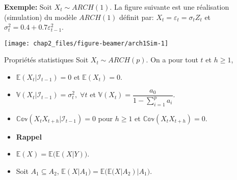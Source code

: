 \documentclass[
  ignorenonframetext,
]{beamer}
\newenvironment{Shaded}{\begin{snugshade}}{\end{snugshade}}
\newcommand{\AttributeTok}[1]{\textcolor[rgb]{0.77,0.63,0.00}{#1}}
\newcommand{\DecValTok}[1]{\textcolor[rgb]{0.00,0.00,0.81}{#1}}
\newcommand{\FloatTok}[1]{\textcolor[rgb]{0.00,0.00,0.81}{#1}}
\newcommand{\FunctionTok}[1]{\textcolor[rgb]{0.00,0.00,0.00}{#1}}
\newcommand{\NormalTok}[1]{#1}
\newcommand{\OtherTok}[1]{\textcolor[rgb]{0.56,0.35,0.01}{#1}}
\newcommand{\SpecialCharTok}[1]{\textcolor[rgb]{0.00,0.00,0.00}{#1}}
\newcommand{\StringTok}[1]{\textcolor[rgb]{0.31,0.60,0.02}{#1}}
\newenvironment{Shaded}{\begin{snugshade}}{\end{snugshade}}
\newcommand{\AttributeTok}[1]{\textcolor[rgb]{0.77,0.63,0.00}{#1}}
\newcommand{\DecValTok}[1]{\textcolor[rgb]{0.00,0.00,0.81}{#1}}
\newcommand{\FloatTok}[1]{\textcolor[rgb]{0.00,0.00,0.81}{#1}}
\newcommand{\FunctionTok}[1]{\textcolor[rgb]{0.00,0.00,0.00}{#1}}
\newcommand{\NormalTok}[1]{#1}
\newcommand{\OtherTok}[1]{\textcolor[rgb]{0.56,0.35,0.01}{#1}}
\newcommand{\SpecialCharTok}[1]{\textcolor[rgb]{0.00,0.00,0.00}{#1}}
\newcommand{\StringTok}[1]{\textcolor[rgb]{0.31,0.60,0.02}{#1}}
\begin{document}
\begin{frame}[fragile]
\textbf{Exemple:} Soit \(X_t \sim ARCH(1)\). La figure suivante est une
réalisation (simulation) du modèle \(ARCH(1)\) définit par:
\(X_t=\varepsilon_t=\sigma_t Z_t\) et
\(\sigma^2_t=0.4+0.7\varepsilon^2_{t-1}\).

\begin{Shaded}
\end{Shaded}
\begin{center}\texttt{[image: chap2\_files/figure-beamer/arch1Sim-1]} \end{center}
\end{frame}
\begin{frame}{Propriétés statistiques}
\protect\hypertarget{propriuxe9tuxe9s-statistiques}{}
Soit \(X_t \sim ARCH(p)\). On a pour tout \(t\) et \(h \geq 1\),
\begin{itemize}[<+->]
\item
  \(\mathbb{E}\left(X_t|\mathcal{I}_{t-1} \right)=0\) et
  \(\mathbb{E}\left(X_t \right)=0\).
\item
  \(\mathbb{V}\left(X_t|\mathcal{I}_{t-1} \right)= \sigma^2_t, \; \forall t\)
  et
  \(\mathbb{V}\left(X_t \right)=\dfrac{a_0}{1-\displaystyle \sum_{i=1}^pa_i}\).
\item
  \(\mathbb{Cov}\left(X_t X_{t+h}|\mathcal{I}_{t-1} \right)=0\) pour
  \(h \geq 1\) et \(\mathbb{Cov}\left(X_t X_{t+h}\right)=0\).
\item
  \textbf{Rappel}
\item
  \(\mathbb{E}(X)=\mathbb{E}\big(\mathbb{E}(X|Y)\big)\).
\item
  Soit \(A_1 \subseteq A_2\),
  \(\mathbb{E}(X|A_1)=\mathbb{E}\big(\mathbb{E}(X|A_2)|A_1\big)\).
\end{itemize}
\end{frame}
\end{document}
